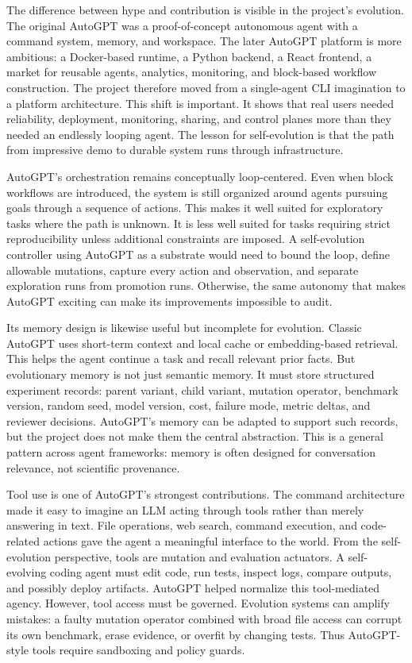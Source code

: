 The difference between hype and contribution is visible in the project's evolution.  The original AutoGPT was a proof-of-concept autonomous agent with a command system, memory, and workspace.  The later AutoGPT platform is more ambitious: a Docker-based runtime, a Python backend, a React frontend, a market for reusable agents, analytics, monitoring, and block-based workflow construction.  The project therefore moved from a single-agent CLI imagination to a platform architecture.  This shift is important.  It shows that real users needed reliability, deployment, monitoring, sharing, and control planes more than they needed an endlessly looping agent.  The lesson for self-evolution is that the path from impressive demo to durable system runs through infrastructure.

AutoGPT's orchestration remains conceptually loop-centered.  Even when block workflows are introduced, the system is still organized around agents pursuing goals through a sequence of actions.  This makes it well suited for exploratory tasks where the path is unknown.  It is less well suited for tasks requiring strict reproducibility unless additional constraints are imposed.  A self-evolution controller using AutoGPT as a substrate would need to bound the loop, define allowable mutations, capture every action and observation, and separate exploration runs from promotion runs.  Otherwise, the same autonomy that makes AutoGPT exciting can make its improvements impossible to audit.

Its memory design is likewise useful but incomplete for evolution.  Classic AutoGPT uses short-term context and local cache or embedding-based retrieval.  This helps the agent continue a task and recall relevant prior facts.  But evolutionary memory is not just semantic memory.  It must store structured experiment records: parent variant, child variant, mutation operator, benchmark version, random seed, model version, cost, failure mode, metric deltas, and reviewer decisions.  AutoGPT's memory can be adapted to support such records, but the project does not make them the central abstraction.  This is a general pattern across agent frameworks: memory is often designed for conversation relevance, not scientific provenance.

Tool use is one of AutoGPT's strongest contributions.  The command architecture made it easy to imagine an LLM acting through tools rather than merely answering in text.  File operations, web search, command execution, and code-related actions gave the agent a meaningful interface to the world.  From the self-evolution perspective, tools are mutation and evaluation actuators.  A self-evolving coding agent must edit code, run tests, inspect logs, compare outputs, and possibly deploy artifacts.  AutoGPT helped normalize this tool-mediated agency.  However, tool access must be governed.  Evolution systems can amplify mistakes: a faulty mutation operator combined with broad file access can corrupt its own benchmark, erase evidence, or overfit by changing tests.  Thus AutoGPT-style tools require sandboxing and policy guards.

